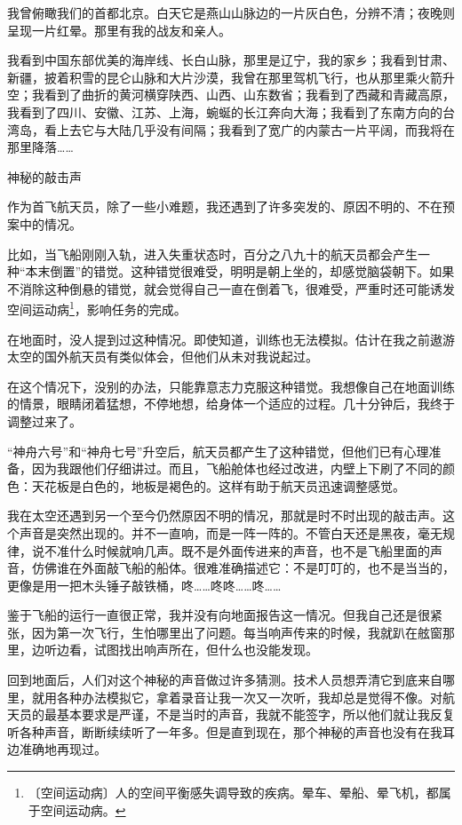 \documentclass[12pt,UTF-8,openany]{ctexbook}
\begin{document}
\begin{large}
    我曾俯瞰我们的首都北京。白天它是燕山山脉边的一片灰白色，分辨不清；夜晚则呈现一片红晕。那里有我的战友和亲人。
    
    我看到中国东部优美的海岸线、长白山脉，那里是辽宁，我的家乡；我看到甘肃、新疆，披着积雪的昆仑山脉和大片沙漠，我曾在那里驾机飞行，也从那里乘火箭升空；我看到了曲折的黄河横穿陕西、山西、山东数省；我看到了西藏和青藏高原，我看到了四川、安徽、江苏、上海，蜿蜒的长江奔向大海；我看到了东南方向的台湾岛，看上去它与大陆几乎没有间隔；我看到了宽广的内蒙古一片平阔，而我将在那里降落……
    
    神秘的敲击声
    
    作为首飞航天员，除了一些小难题，我还遇到了许多突发的、原因不明的、不在预案中的情况。
    
    比如，当飞船刚刚入轨，进入失重状态时，百分之八九十的航天员都会产生一种“本末倒置”的错觉。这种错觉很难受，明明是朝上坐的，却感觉脑袋朝下。如果不消除这种倒悬的错觉，就会觉得自己一直在倒着飞，很难受，严重时还可能诱发空间运动病\footnote{〔空间运动病〕人的空间平衡感失调导致的疾病。晕车、晕船、晕飞机，都属于空间运动病。}，影响任务的完成。
    
    在地面时，没人提到过这种情况。即使知道，训练也无法模拟。估计在我之前遨游太空的国外航天员有类似体会，但他们从未对我说起过。
    
    在这个情况下，没别的办法，只能靠意志力克服这种错觉。我想像自己在地面训练的情景，眼睛闭着猛想，不停地想，给身体一个适应的过程。几十分钟后，我终于调整过来了。
    
    “神舟六号”和“神舟七号”升空后，航天员都产生了这种错觉，但他们已有心理准备，因为我跟他们仔细讲过。而且，飞船舱体也经过改进，内壁上下刷了不同的颜色：天花板是白色的，地板是褐色的。这样有助于航天员迅速调整感觉。
    
    我在太空还遇到另一个至今仍然原因不明的情况，那就是时不时出现的敲击声。这个声音是突然出现的。并不一直响，而是一阵一阵的。不管白天还是黑夜，毫无规律，说不准什么时候就响几声。既不是外面传进来的声音，也不是飞船里面的声音，仿佛谁在外面敲飞船的船体。很难准确描述它：不是叮叮的，也不是当当的，更像是用一把木头锤子敲铁桶，咚……咚咚……咚……
    
    鉴于飞船的运行一直很正常，我并没有向地面报告这一情况。但我自己还是很紧张，因为第一次飞行，生怕哪里出了问题。每当响声传来的时候，我就趴在舷窗那里，边听边看，试图找出响声所在，但什么也没能发现。
    
    回到地面后，人们对这个神秘的声音做过许多猜测。技术人员想弄清它到底来自哪里，就用各种办法模拟它，拿着录音让我一次又一次听，我却总是觉得不像。对航天员的最基本要求是严谨，不是当时的声音，我就不能签字，所以他们就让我反复听各种声音，断断续续听了一年多。但是直到现在，那个神秘的声音也没有在我耳边准确地再现过。
    

\end{large}
\end{document}

